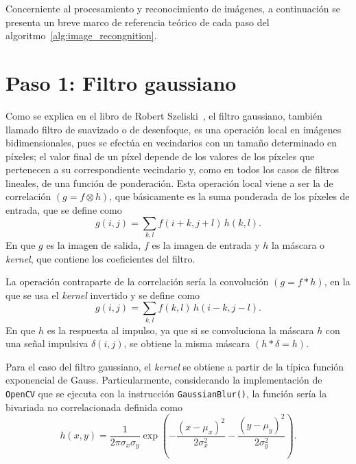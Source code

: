 Concerniente al procesamiento y reconocimiento de imágenes, a continuación se presenta un breve marco de referencia teórico de cada paso del algoritmo~\ref{alg:image_recongnition}.

\section*{Paso 1: Filtro gaussiano}
\label{sec:gaussian_filter}
Como se explica en el libro de Robert Szeliski~\citeyearpar{Richard2011}, el filtro gaussiano, también llamado filtro de suavizado o de desenfoque, es una operación local en imágenes bidimensionales, pues se efectúa en vecindarios con un tamaño determinado en píxeles;
el valor final de un píxel depende de los valores de los píxeles que pertenecen a su correspondiente vecindario y, como en todos los casos de filtros lineales, de una función de ponderación.
Esta operación local viene a ser la de correlación $\left(g = f \otimes h\right)$, que básicamente es la suma ponderada de los píxeles de entrada, que se define como
%
\begin{equation}
    \label{eq:correlation}
    g(i, j) = \sum_{k, l} f(i + k, j + l)\,h(k, l).
\end{equation}
%
En que $g$ es la imagen de salida, $f$ es la imagen de entrada y $h$ la máscara o \emph{kernel}, que contiene los coeficientes del filtro.

La operación contraparte de la correlación sería la convolución $\left(g = f \ast h\right)$, en la que se usa el \emph{kernel} invertido y se define como
%
\begin{equation}
    \label{eq:convolution}
    g(i, j) = \sum_{k, l} f(k, l)\,h(i - k, j - l).
\end{equation}
%
En que $h$ es la respuesta al impulso, ya que si se convoluciona la máscara $h$ con una señal impulsiva $\delta(i, j)$, se obtiene la misma máscara $\left(h \ast \delta = h\right)$.

Para el caso del filtro gaussiano, el \emph{kernel} se obtiene a partir de la típica función exponencial de Gauss.
Particularmente, considerando la implementación de \texttt{\small OpenCV} que se ejecuta con la instrucción \texttt{\small GaussianBlur()}, la función sería la bivariada no correlacionada definida como
%
\begin{equation}
    \label{eq:bivariate_gaussian}
    h(x, y) = \frac{1}{2\pi\sigma_x\sigma_y}
    \exp\left(-\frac{\left(x - \mu_x\right)^2}{2\sigma_x^2} - \frac{\left(y - \mu_y\right)^2}{2\sigma_y^2}\right).
\end{equation}

